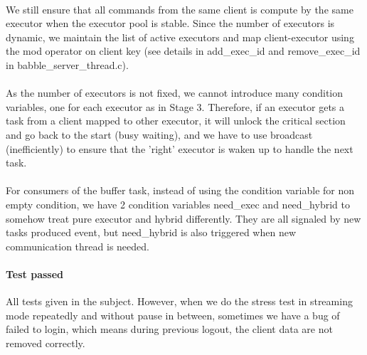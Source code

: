 \documentclass{article}
\begin{document}
\paragraph{} We still ensure that all commands from the same client is compute by the same executor when the executor pool is stable. Since the number of executors is dynamic, we maintain the list of active executors and map client-executor using the mod operator on client key (see details in add\_exec\_id and remove\_exec\_id in babble\_server\_thread.c).
\paragraph{} As the number of executors is not fixed, we cannot introduce many condition variables, one for each executor as in Stage 3. Therefore, if an executor gets a task from a client mapped to other executor, it will unlock the critical section and go back to the start (busy waiting), and we have to use broadcast (inefficiently) to ensure that the 'right' executor is waken up to handle the next task.
\paragraph{} For consumers of the buffer task, instead of using the condition variable for non empty condition, we have 2 condition variables need\_exec and need\_hybrid to somehow treat pure executor and hybrid differently. They are all signaled by new tasks produced event, but need\_hybrid is also triggered when new communication thread is needed.
\paragraph{Test passed} All tests given in the subject. However, when we do the stress test in streaming mode repeatedly and without pause in between, sometimes we have a bug of failed to login, which means during previous logout, the client data are not removed correctly.
\end{document}

